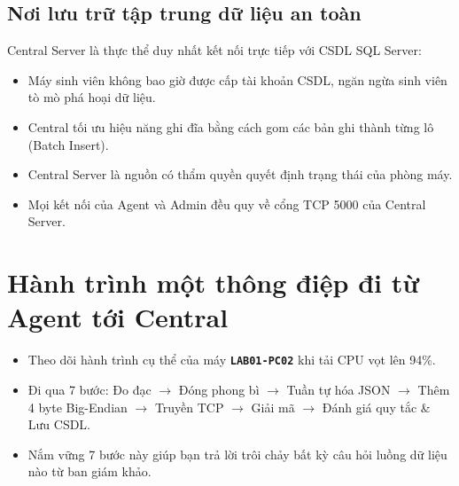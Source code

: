 \documentclass[12pt,a4paper]{article}
\begin{document}
\subsection{Nơi lưu trữ tập trung dữ liệu an toàn}
Central Server là thực thể duy nhất kết nối trực tiếp với CSDL SQL Server:
\begin{itemize}
  \item Máy sinh viên không bao giờ được cấp tài khoản CSDL, ngăn ngừa sinh viên tò mò phá hoại dữ liệu.
  \item Central tối ưu hiệu năng ghi đĩa bằng cách gom các bản ghi thành từng lô (Batch Insert).
\end{itemize}

\begin{takeawaybox}
\begin{itemize}[leftmargin=1.5em, itemsep=1pt]
  \item Central Server là nguồn có thẩm quyền quyết định trạng thái của phòng máy.
  \item Mọi kết nối của Agent và Admin đều quy về cổng TCP 5000 của Central Server.
\end{itemize}
\end{takeawaybox}

\section[Hành trình một thông điệp]{Hành trình một thông điệp đi từ Agent tới Central}

\begin{summarybox}
\begin{itemize}[leftmargin=1.5em, itemsep=1pt]
  \item Theo dõi hành trình cụ thể của máy \textbf{\texttt{LAB01-PC02}} khi tải CPU vọt lên 94\%.
  \item Đi qua 7 bước: Đo đạc $\rightarrow$ Đóng phong bì $\rightarrow$ Tuần tự hóa JSON $\rightarrow$ Thêm 4 byte Big-Endian $\rightarrow$ Truyền TCP $\rightarrow$ Giải mã $\rightarrow$ Đánh giá quy tắc \& Lưu CSDL.
  \item Nắm vững 7 bước này giúp bạn trả lời trôi chảy bất kỳ câu hỏi luồng dữ liệu nào từ ban giám khảo.
\end{itemize}
\end{summarybox}
\end{document}
